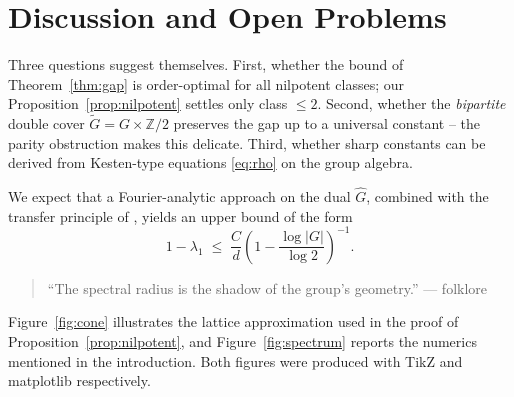 \section{Discussion and Open Problems}
\label{sec:discussion-body}

Three questions suggest themselves. First, whether the bound of
Theorem~\ref{thm:gap} is order-optimal for all nilpotent classes; our
Proposition~\ref{prop:nilpotent} settles only class $\le 2$. Second,
whether the \emph{bipartite} double cover $\tilde G = G \times \mathbb{Z}/2$
preserves the gap up to a universal constant -- the parity obstruction makes
this delicate. Third, whether sharp constants can be derived from
Kesten-type equations \eqref{eq:rho} on the group algebra.

We expect that a Fourier-analytic approach on the dual $\hat G$, combined
with the transfer principle of \cite{Lubotzky}, yields an upper bound of
the form
\begin{equation}
\label{eq:conj}
1 - \lambda_1 \;\le\; \frac{C}{d} \left( 1 - \frac{\log |G|}{\log 2} \right)^{-1}.
\end{equation}

\begin{quote}
``The spectral radius is the shadow of the group's geometry.'' --- folklore
\end{quote}

Figure~\ref{fig:cone} illustrates the lattice approximation used in the proof
of Proposition~\ref{prop:nilpotent}, and Figure~\ref{fig:spectrum} reports the
numerics mentioned in the introduction. Both figures were produced with
TikZ and matplotlib respectively.
